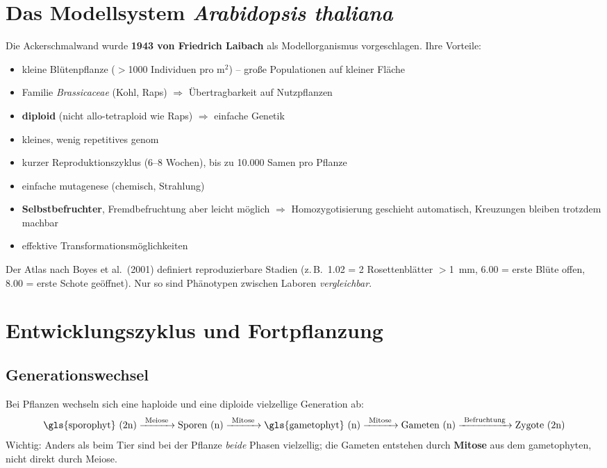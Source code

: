 

\section{Das Modellsystem \emph{Arabidopsis thaliana}}\label{sec:das-modellsystem-art{arabidopsis-thaliana}}

Die Ackerschmalwand wurde \textbf{1943 von Friedrich Laibach} als Modellorganismus vorgeschlagen.
Ihre Vorteile:

\begin{itemize}
    \item kleine Blütenpflanze ($>$1000 Individuen pro m$^2$) -- gro{\ss}e Populationen auf kleiner Fläche
    \item Familie \emph{Brassicaceae} (Kohl, Raps) $\Rightarrow$ Übertragbarkeit auf Nutzpflanzen
    \item \textbf{diploid} (nicht allo-tetraploid wie Raps) $\Rightarrow$ einfache Genetik
    \item kleines, wenig repetitives \gls{genom}
    \item kurzer Reproduktionszyklus (6--8 Wochen), bis zu 10.000 Samen pro Pflanze
    \item einfache \gls{mutagenese} (chemisch, Strahlung)
    \item \textbf{Selbstbefruchter}, Fremdbefruchtung aber leicht möglich $\Rightarrow$ Homozygotisierung geschieht automatisch, Kreuzungen bleiben trotzdem machbar
    \item effektive Transformationsmöglichkeiten
\end{itemize}

\begin{bem}
    Der Atlas nach Boyes et al.\ (2001) definiert reproduzierbare Stadien (z.\,B.\ 1.02 = 2 Rosettenblätter $>$1\,
    mm, 6.00 = erste Blüte offen, 8.00 = erste Schote geöffnet).
    Nur so sind Phänotypen zwischen Laboren \emph{vergleichbar}.
\end{bem}

\section{Entwicklungszyklus und Fortpflanzung}\label{sec:entwicklungszyklus-und-fortpflanzung}

\subsection*{Generationswechsel}\label{subsec:generationswechsel}
Bei Pflanzen wechseln sich eine haploide und eine diploide vielzellige Generation ab:
\[
    \text{\gls{sporophyt} (2n)} \xrightarrow{\ \text{Meiose}\ } \text{Sporen (n)} \xrightarrow{\ \text{Mitose}\ } \text{\gls{gametophyt} (n)} \xrightarrow{\ \text{Mitose}\ } \text{Gameten (n)} \xrightarrow{\ \text{Befruchtung}\ } \text{Zygote (2n)}
\]
Wichtig: Anders als beim Tier sind bei der Pflanze \emph{beide} Phasen vielzellig; die Gameten entstehen durch \textbf{Mitose} aus dem \gls{gametophyt}en, nicht direkt durch Meiose.

